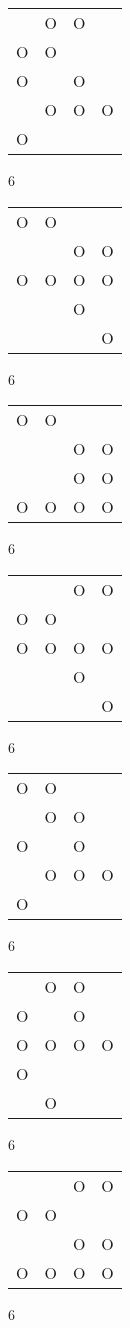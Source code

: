 \begin{tabular}{|m{0.2cm}m{0.2cm}m{0.2cm}m{0.2cm}|}\hline
 &O&O& \\
O&O& & \\
O& &O& \\
 &O&O&O\\
O& & & \\
\hline\end{tabular}6
\begin{tabular}{|m{0.2cm}m{0.2cm}m{0.2cm}m{0.2cm}|}\hline
O&O& & \\
 & &O&O\\
O&O&O&O\\
 & &O& \\
 & & &O\\
\hline\end{tabular}6
\begin{tabular}{|m{0.2cm}m{0.2cm}m{0.2cm}m{0.2cm}|}\hline
O&O& & \\
 & &O&O\\
 & &O&O\\
O&O&O&O\\
\hline\end{tabular}6
\begin{tabular}{|m{0.2cm}m{0.2cm}m{0.2cm}m{0.2cm}|}\hline
 & &O&O\\
O&O& & \\
O&O&O&O\\
 & &O& \\
 & & &O\\
\hline\end{tabular}6
\begin{tabular}{|m{0.2cm}m{0.2cm}m{0.2cm}m{0.2cm}|}\hline
O&O& & \\
 &O&O& \\
O& &O& \\
 &O&O&O\\
O& & & \\
\hline\end{tabular}6
\begin{tabular}{|m{0.2cm}m{0.2cm}m{0.2cm}m{0.2cm}|}\hline
 &O&O& \\
O& &O& \\
O&O&O&O\\
O& & & \\
 &O& & \\
\hline\end{tabular}6
\begin{tabular}{|m{0.2cm}m{0.2cm}m{0.2cm}m{0.2cm}|}\hline
 & &O&O\\
O&O& & \\
 & &O&O\\
O&O&O&O\\
\hline\end{tabular}6
